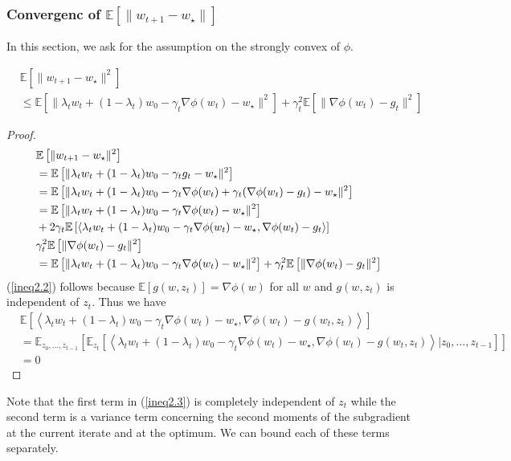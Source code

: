 \subsubsection{Convergenc of $\mathbb{E}\left[ \|w_{t+1}-w_\star\| \right]$}
In this section, we ask for the assumption on the strongly convex of $\phi$.

\begin{lemma}
	\begin{equation}
		\begin{split}
			&\mathbb{E}\left[\|w_{t+1}-w_\star\|^2 \right]\\
			&\leq \mathbb{E}\left[\|\lambda_t w_t +(1-\lambda_t)w_0 -\gamma_t \nabla\phi(w_t)-w_\star\|^2 \right]
			+\gamma_t^2\mathbb{E}\left[\|\nabla \phi(w_t)-g_t\|^2 \right]
		\end{split}
	\end{equation}
\end{lemma}
\begin{proof}
	\begin{align}
		&\mathbb{E}\left[\|w_{t+1}-w_\star\|^2 \right]\\
		&=\mathbb{E}\left[\|\lambda_t w_t +(1-\lambda_t)w_0 -\gamma_t g_t -w_\star\|^2 \right]\\
		&=\mathbb{E}\left[\|\lambda_t w_t +(1-\lambda_t)w_0 -\gamma_t \nabla\phi(w_t) +\gamma_t(\nabla \phi(w_t)-g_t) -w_\star\|^2 \right]\\
		\notag
		&=\mathbb{E}\left[\|\lambda_t w_t +(1-\lambda_t)w_0 -\gamma_t \nabla\phi(w_t)-w_\star\|^2 \right]\\
		\notag
		&+2\gamma_t\mathbb{E}\left[\left<\lambda_t w_t +(1-\lambda_t)w_0 -\gamma_t \nabla\phi(w_t)-w_\star , \nabla \phi(w_t)-g_t\right> \right]\\
		\label{ineq2.2}
		&\gamma_t^2\mathbb{E}\left[\|\nabla \phi(w_t)-g_t\|^2 \right]\\
		\label{ineq2.3}
		&=\mathbb{E}\left[\|\lambda_t w_t +(1-\lambda_t)w_0 -\gamma_t \nabla\phi(w_t)-w_\star\|^2 \right]
		+\gamma_t^2\mathbb{E}\left[\|\nabla \phi(w_t)-g_t\|^2 \right]
	\end{align}
	(\ref{ineq2.2}) follows because $\mathbb{E}\left[g(w,z_t) \right]=\nabla\phi(w)$ for all $w$ and $g(w,z_t)$ is independent of $z_t$.
	Thus we have
	\begin{equation}
		\begin{split}
			&\mathbb{E}\left[\left<\lambda_t w_t +(1-\lambda_t)w_0 -\gamma_t \nabla\phi(w_t)-w_\star , \nabla \phi(w_t)-g(w_t,z_t)\right> \right]\\
			&=\mathbb{E}_{z_0,\dots,z_{t-1}}\left[\mathbb{E}_{z_t}\left[\left< \lambda_t w_t +(1-\lambda_t)w_0 -\gamma_t \nabla\phi(w_t)-w_\star , \nabla \phi(w_t)-g(w_t,z_t) \right>| z_0,\dots,z_{t-1} \right] \right]\\
			&=0
		\end{split}
	\end{equation}
\end{proof}
Note that the first term in (\ref{ineq2.3}) is completely independent of $z_t$ while the second term is a variance term concerning the second moments of the subgradient at the current iterate and at the optimum.
We can bound each of these terms separately.

